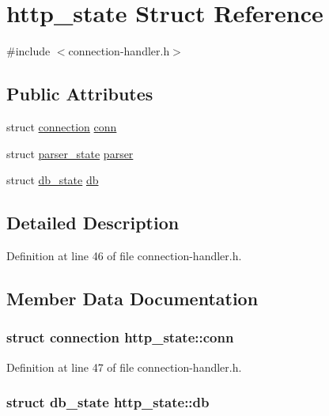 \hypertarget{structhttp__state}{\section{http\-\_\-state Struct Reference}
\label{structhttp__state}
}


{\ttfamily \#include $<$connection-\/handler.\-h$>$}

\subsection*{Public Attributes}
\begin{DoxyCompactItemize}
\item 
struct \hyperlink{structconnection}{connection} \hyperlink{structhttp__state_af220a1e33cf7177d4d4ca101a46547ec}{conn}
\item 
struct \hyperlink{structparser__state}{parser\-\_\-state} \hyperlink{structhttp__state_a3eda42ab7c2b2dfbc61a1cc5eb076555}{parser}
\item 
struct \hyperlink{structdb__state}{db\-\_\-state} \hyperlink{structhttp__state_a7b27d01030cc535f0cfe1254f452f243}{db}
\end{DoxyCompactItemize}


\subsection{Detailed Description}


Definition at line 46 of file connection-\/handler.\-h.



\subsection{Member Data Documentation}
\hypertarget{structhttp__state_af220a1e33cf7177d4d4ca101a46547ec}{
\subsubsection[{conn}]{\setlength{\rightskip}{0pt plus 5cm}struct {\bf connection} http\-\_\-state\-::conn}}\label{structhttp__state_af220a1e33cf7177d4d4ca101a46547ec}


Definition at line 47 of file connection-\/handler.\-h.

\hypertarget{structhttp__state_a7b27d01030cc535f0cfe1254f452f243}{
\subsubsection[{db}]{\setlength{\rightskip}{0pt plus 5cm}struct {\bf db\-\_\-state} http\-\_\-state\-::db}}\label{structhttp__state_a7b27d01030cc535f0cfe1254f452f243}


